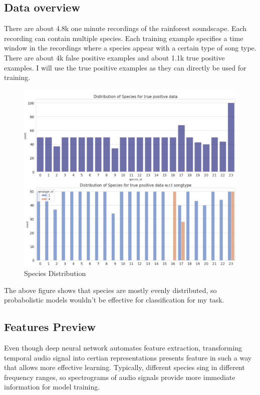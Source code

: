 \documentclass[12pt]{article}
\begin{document}
\subsection*{Data overview}\small{
There are about 4.8k one minute recordings of the rainforest soundscape. Each recording can contain multiple species. Each training example specifies a time window in the recordings where a species appear with a certain type of song type. There are about 4k false positive examples and about 1.1k true positive examples. I will use the true positive examples as they can directly be used for training.}

\begin{figure}[h!]
     \includegraphics[scale=1, center]{distribution.JPG}
    \caption{Species Distribution}
    \label{fig:distribution}
\end{figure}
  

\small{ The above figure shows that species are mostly evenly distributed, so probabolistic models wouldn't be effective for classification for my task. 
}

\subsection*{Features Preview}

Even though deep neural network automates feature extraction, transforming temporal audio signal into certian representations presents feature in such a way that allows more effective learning. Typically, different species sing in different frequency ranges, so spectrograms of audio signals provide more immediate information for model training. 
\end{document}
